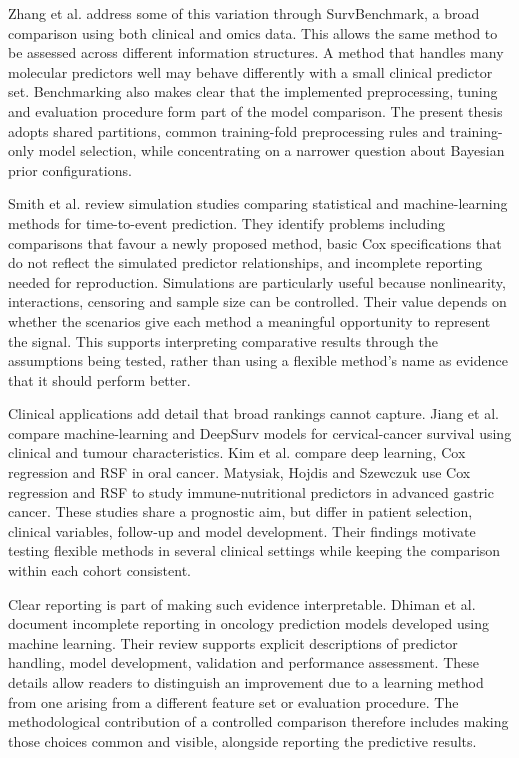 Zhang et al. \cite{ref33} address some of this variation through SurvBenchmark, a broad comparison using both clinical and omics data. This allows the same method to be assessed across different information structures. A method that handles many molecular predictors well may behave differently with a small clinical predictor set. Benchmarking also makes clear that the implemented preprocessing, tuning and evaluation procedure form part of the model comparison. The present thesis adopts shared partitions, common training-fold preprocessing rules and training-only model selection, while concentrating on a narrower question about Bayesian prior configurations.

Smith et al. \cite{ref44} review simulation studies comparing statistical and machine-learning methods for time-to-event prediction. They identify problems including comparisons that favour a newly proposed method, basic Cox specifications that do not reflect the simulated predictor relationships, and incomplete reporting needed for reproduction. Simulations are particularly useful because nonlinearity, interactions, censoring and sample size can be controlled. Their value depends on whether the scenarios give each method a meaningful opportunity to represent the signal. This supports interpreting comparative results through the assumptions being tested, rather than using a flexible method's name as evidence that it should perform better.

Clinical applications add detail that broad rankings cannot capture. Jiang et al. \cite{ref9} compare machine-learning and DeepSurv models for cervical-cancer survival using clinical and tumour characteristics. Kim et al. \cite{ref77} compare deep learning, Cox regression and RSF in oral cancer. Matysiak, Hojdis and Szewczuk \cite{ref12} use Cox regression and RSF to study immune-nutritional predictors in advanced gastric cancer. These studies share a prognostic aim, but differ in patient selection, clinical variables, follow-up and model development. Their findings motivate testing flexible methods in several clinical settings while keeping the comparison within each cohort consistent.

Clear reporting is part of making such evidence interpretable. Dhiman et al. \cite{ref35} document incomplete reporting in oncology prediction models developed using machine learning. Their review supports explicit descriptions of predictor handling, model development, validation and performance assessment. These details allow readers to distinguish an improvement due to a learning method from one arising from a different feature set or evaluation procedure. The methodological contribution of a controlled comparison therefore includes making those choices common and visible, alongside reporting the predictive results.

